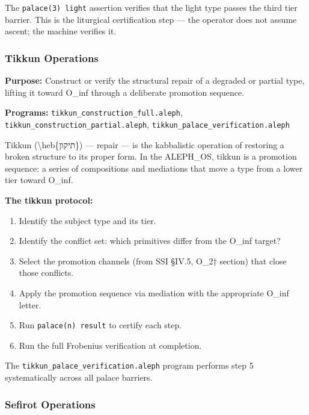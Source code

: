 \documentclass[12pt,a4paper]{article}
\newcommand{\pilcrow}{\S}
\begin{document}
The \texttt{palace(3) light} assertion verifies that the light type passes the third tier barrier. This is the liturgical certification step --- the operator does not assume ascent; the machine verifies it.

\subsubsection{Tikkun Operations}

\textbf{Purpose:} Construct or verify the structural repair of a degraded or partial type, lifting it toward O\_inf through a deliberate promotion sequence.

\textbf{Programs:} \texttt{tikkun\_\allowbreak construction\_\allowbreak full.\allowbreak aleph}, \texttt{tikkun\_\allowbreak construction\_\allowbreak partial.\allowbreak aleph}, \texttt{tikkun\_\allowbreak palace\_\allowbreak verification.\allowbreak aleph}

Tikkun (\textbackslash{}heb\{תיקון\}) --- repair --- is the kabbalistic operation of restoring a broken structure to its proper form. In the ALEPH\_OS, tikkun is a promotion sequence: a series of compositions and mediations that move a type from a lower tier toward O\_inf.

\textbf{The tikkun protocol:}

\begin{enumerate}
    \item Identify the subject type and its tier.
    \item Identify the conflict set: which primitives differ from the O\_inf target?
    \item Select the promotion channels (from SSI \pilcrow{}IV.5, O\_2† section) that close those conflicts.
    \item Apply the promotion sequence via mediation with the appropriate O\_inf letter.
    \item Run \texttt{palace(n) result} to certify each step.
    \item Run the full Frobenius verification at completion.
\end{enumerate}

The \texttt{tikkun\_\allowbreak palace\_\allowbreak verification.\allowbreak aleph} program performs step 5 systematically across all palace barriers.

\subsubsection{Sefirot Operations}
\end{document}
